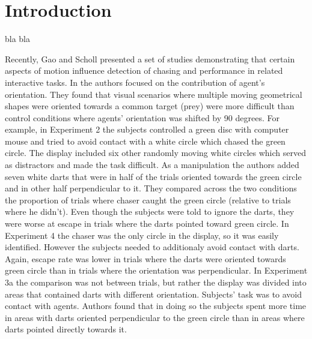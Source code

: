 \documentclass{article}
\begin{document}
\section{Introduction}

bla bla

Recently, Gao and Scholl presented a set of studies \citep{gao09,gao10,gao11} demonstrating that certain aspects of motion influence detection of chasing and performance in related interactive tasks. In \citet{gao10} the authors focused on the contribution of agent's orientation. They found that visual scenarios where multiple moving geometrical shapes were oriented towards a common target (prey) were more difficult than control conditions where agents' orientation was shifted by 90 degrees. For example, in Experiment 2 the subjects controlled a green disc with computer mouse and tried to avoid contact with a white circle which chased the green circle. The display included six other randomly moving white circles which served as distractors and made the task difficult. As a manipulation the authors added seven white darts that were in half of the trials oriented towards the green circle and in other half perpendicular to it. They compared across the two conditions the proportion of trials where chaser caught the green circle (relative to trials where he didn't). Even though the subjects were told to ignore the darts, they were worse at escape in trials where the darts pointed toward green circle. In Experiment 4 the chaser was the only circle in the display, so it was easily identified. However the subjects needed to additionaly avoid contact with darts. Again, escape rate was lower in trials where the darts were oriented towards green circle than in trials where the orientation was perpendicular. In Experiment 3a the comparison was not between trials, but rather the display was divided into areas that contained darts with different orientation. Subjects' task was to avoid contact with agents. Authors found that in doing so the subjects spent more time in areas with darts oriented perpendicular to the green circle than in areas where darts pointed directly towards it.\\
\end{document}
